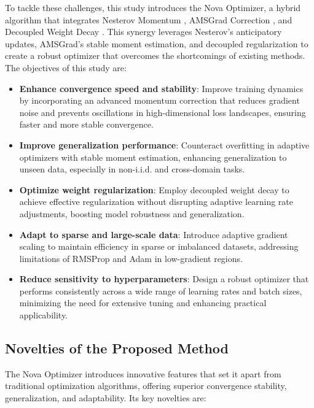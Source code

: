 \documentclass{article}
\begin{document}
To tackle these challenges, this study introduces the Nova Optimizer, a hybrid algorithm that integrates Nesterov Momentum \cite{nesterov1983method}, AMSGrad Correction \cite{Reddi2018}, and Decoupled Weight Decay \cite{Loshchilov2017}. This synergy leverages Nesterov’s anticipatory updates, AMSGrad’s stable moment estimation, and decoupled regularization to create a robust optimizer that overcomes the shortcomings of existing methods. The objectives of this study are:

\begin{itemize}
\item \textbf{Enhance convergence speed and stability}: Improve training dynamics by incorporating an advanced momentum correction that reduces gradient noise and prevents oscillations in high-dimensional loss landscapes, ensuring faster and more stable convergence.

\item \textbf{Improve generalization performance}: Counteract overfitting in adaptive optimizers with stable moment estimation, enhancing generalization to unseen data, especially in non-i.i.d. and cross-domain tasks.

\item \textbf{Optimize weight regularization}: Employ decoupled weight decay to achieve effective regularization without disrupting adaptive learning rate adjustments, boosting model robustness and generalization.

\item \textbf{Adapt to sparse and large-scale data}: Introduce adaptive gradient scaling to maintain efficiency in sparse or imbalanced datasets, addressing limitations of RMSProp and Adam in low-gradient regions.

\item \textbf{Reduce sensitivity to hyperparameters}: Design a robust optimizer that performs consistently across a wide range of learning rates and batch sizes, minimizing the need for extensive tuning and enhancing practical applicability.
\end{itemize}

\subsection{Novelties of the Proposed Method}

The Nova Optimizer introduces innovative features that set it apart from traditional optimization algorithms, offering superior convergence stability, generalization, and adaptability. Its key novelties are:
\end{document}
